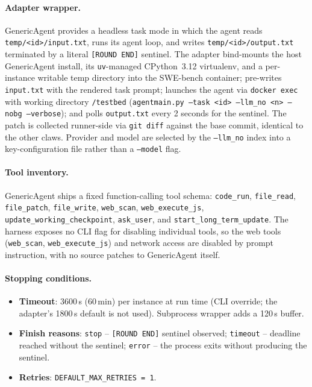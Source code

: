 \paragraph{Adapter wrapper.}
GenericAgent provides a headless task mode in which the agent reads
\texttt{temp/<id>/input.txt}, runs its agent loop, and writes
\texttt{temp/<id>/output.txt} terminated by a literal \texttt{[ROUND END]}
sentinel. The adapter bind-mounts the host GenericAgent install, its
\texttt{uv}-managed CPython~3.12 virtualenv, and a per-instance writable temp
directory into the SWE-bench container; pre-writes \texttt{input.txt} with the
rendered task prompt; launches the agent via \texttt{docker exec} with working
directory \texttt{/testbed}
(\texttt{agentmain.py --task <id> --llm\_no <n> --nobg --verbose});
and polls \texttt{output.txt} every 2 seconds for the sentinel. The patch is
collected runner-side via \texttt{git diff} against the base commit, identical
to the other claws. Provider and model are selected by the \texttt{--llm\_no}
index into a key-configuration file rather than a \texttt{--model} flag.

\paragraph{Tool inventory.}
GenericAgent ships a fixed function-calling tool schema:
\texttt{code\_run}, \texttt{file\_read}, \texttt{file\_patch},
\texttt{file\_write}, \texttt{web\_scan}, \texttt{web\_execute\_js},
\texttt{update\_working\_checkpoint}, \texttt{ask\_user}, and
\texttt{start\_long\_term\_update}. The harness exposes no CLI flag for
disabling individual tools, so the web tools (\texttt{web\_scan},
\texttt{web\_execute\_js}) and network access are disabled by prompt
instruction, with no source patches to GenericAgent itself.

\paragraph{Stopping conditions.}
\begin{itemize}
  \item \textbf{Timeout}: 3600\,s (60\,min) per instance at run time (CLI
  override; the adapter's 1800\,s default is not used). Subprocess wrapper
  adds a 120\,s buffer.
  \item \textbf{Finish reasons}: \texttt{stop} -- \texttt{[ROUND END]}
  sentinel observed; \texttt{timeout} -- deadline reached without the
  sentinel; \texttt{error} -- the process exits without producing the
  sentinel.
  \item \textbf{Retries}: \texttt{DEFAULT\_MAX\_RETRIES = 1}.
\end{itemize}

